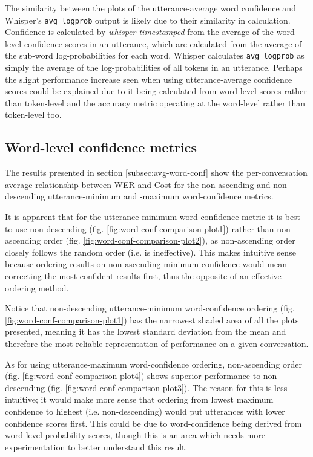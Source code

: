 The similarity between the plots of the utterance-average word confidence and Whisper's \texttt{avg\_logprob} output is likely due to their similarity in calculation.
Confidence is calculated by \emph{whisper-timestamped}\cite{whisper-timestamped} from the average of the word-level confidence scores in an utterance, which are calculated from the average of the sub-word log-probabilities for each word.
Whisper\cite{whisper} calculates \texttt{avg\_logprob} as simply the average of the log-probabilities of all tokens in an utterance.
Perhaps the slight performance increase seen when using utterance-average confidence scores could be explained due to it being calculated from word-level scores rather than token-level and the accuracy metric operating at the word-level rather than token-level too.

\subsection{Word-level confidence metrics}

The results presented in section \ref{subsec:avg-word-conf} show the per-conversation average relationship between WER and Cost for the non-ascending and non-descending utterance-minimum and -maximum word-confidence metrics.

It is apparent that for the utterance-minimum word-confidence metric it is best to use non-descending (fig. \ref{fig:word-conf-comparison-plot1}) rather than non-ascending order (fig. \ref{fig:word-conf-comparison-plot2}), as non-ascending order closely follows the random order (i.e. is ineffective).
This makes intuitive sense because ordering results on non-ascending minimum confidence would mean correcting the most confident results first, thus the opposite of an effective ordering method.

Notice that non-descending utterance-minimum word-confidence ordering (fig. \ref{fig:word-conf-comparison-plot1}) has the narrowest shaded area of all the plots presented, meaning it has the lowest standard deviation from the mean and therefore the most reliable representation of performance on a given conversation.

As for using utterance-maximum word-confidence ordering, non-ascending order (fig. \ref{fig:word-conf-comparison-plot4}) shows superior performance to non-descending (fig. \ref{fig:word-conf-comparison-plot3}).
The reason for this is less intuitive; it would make more sense that ordering from lowest maximum confidence to highest (i.e. non-descending) would put utterances with lower confidence scores first.
This could be due to word-confidence being derived from word-level probability scores, though this is an area which needs more experimentation to better understand this result.

